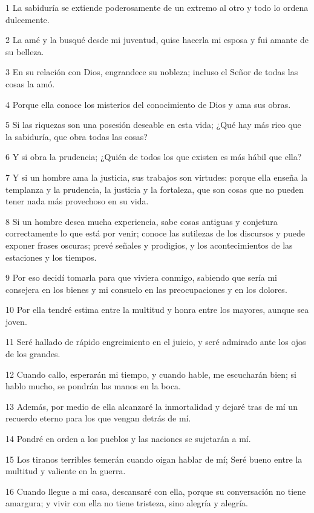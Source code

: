 \par 1 La sabiduría se extiende poderosamente de un extremo al otro y todo lo ordena dulcemente.
\par 2 La amé y la busqué desde mi juventud, quise hacerla mi esposa y fui amante de su belleza.
\par 3 En su relación con Dios, engrandece su nobleza; incluso el Señor de todas las cosas la amó.
\par 4 Porque ella conoce los misterios del conocimiento de Dios y ama sus obras.
\par 5 Si las riquezas son una posesión deseable en esta vida; ¿Qué hay más rico que la sabiduría, que obra todas las cosas?
\par 6 Y si obra la prudencia; ¿Quién de todos los que existen es más hábil que ella?
\par 7 Y si un hombre ama la justicia, sus trabajos son virtudes: porque ella enseña la templanza y la prudencia, la justicia y la fortaleza, que son cosas que no pueden tener nada más provechoso en su vida.
\par 8 Si un hombre desea mucha experiencia, sabe cosas antiguas y conjetura correctamente lo que está por venir; conoce las sutilezas de los discursos y puede exponer frases oscuras; prevé señales y prodigios, y los acontecimientos de las estaciones y los tiempos.
\par 9 Por eso decidí tomarla para que viviera conmigo, sabiendo que sería mi consejera en los bienes y mi consuelo en las preocupaciones y en los dolores.
\par 10 Por ella tendré estima entre la multitud y honra entre los mayores, aunque sea joven.
\par 11 Seré hallado de rápido engreimiento en el juicio, y seré admirado ante los ojos de los grandes.
\par 12 Cuando callo, esperarán mi tiempo, y cuando hable, me escucharán bien; si hablo mucho, se pondrán las manos en la boca.
\par 13 Además, por medio de ella alcanzaré la inmortalidad y dejaré tras de mí un recuerdo eterno para los que vengan detrás de mí.
\par 14 Pondré en orden a los pueblos y las naciones se sujetarán a mí.
\par 15 Los tiranos terribles temerán cuando oigan hablar de mí; Seré bueno entre la multitud y valiente en la guerra.
\par 16 Cuando llegue a mi casa, descansaré con ella, porque su conversación no tiene amargura; y vivir con ella no tiene tristeza, sino alegría y alegría.
